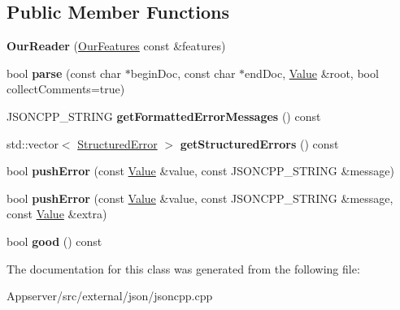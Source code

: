 \subsection*{Public Member Functions}
\begin{DoxyCompactItemize}
\item 
{\bfseries Our\+Reader} (\hyperlink{classJson_1_1OurFeatures}{Our\+Features} const \&features)\hypertarget{classJson_1_1OurReader_a48a850914b9c8d7781be172930c478e5}{}\label{classJson_1_1OurReader_a48a850914b9c8d7781be172930c478e5}

\item 
bool {\bfseries parse} (const char $\ast$begin\+Doc, const char $\ast$end\+Doc, \hyperlink{classJson_1_1Value}{Value} \&root, bool collect\+Comments=true)\hypertarget{classJson_1_1OurReader_aba4f8749aab7f02ec17f107e392caf80}{}\label{classJson_1_1OurReader_aba4f8749aab7f02ec17f107e392caf80}

\item 
J\+S\+O\+N\+C\+P\+P\+\_\+\+S\+T\+R\+I\+NG {\bfseries get\+Formatted\+Error\+Messages} () const\hypertarget{classJson_1_1OurReader_a7971de51d73bb4aee5b0c4742c4aaaac}{}\label{classJson_1_1OurReader_a7971de51d73bb4aee5b0c4742c4aaaac}

\item 
std\+::vector$<$ \hyperlink{structJson_1_1OurReader_1_1StructuredError}{Structured\+Error} $>$ {\bfseries get\+Structured\+Errors} () const\hypertarget{classJson_1_1OurReader_a0eb2420a6bef89a3f3256191e6e3de6d}{}\label{classJson_1_1OurReader_a0eb2420a6bef89a3f3256191e6e3de6d}

\item 
bool {\bfseries push\+Error} (const \hyperlink{classJson_1_1Value}{Value} \&value, const J\+S\+O\+N\+C\+P\+P\+\_\+\+S\+T\+R\+I\+NG \&message)\hypertarget{classJson_1_1OurReader_a700e9d8e0977fa7e0375d26690d7025f}{}\label{classJson_1_1OurReader_a700e9d8e0977fa7e0375d26690d7025f}

\item 
bool {\bfseries push\+Error} (const \hyperlink{classJson_1_1Value}{Value} \&value, const J\+S\+O\+N\+C\+P\+P\+\_\+\+S\+T\+R\+I\+NG \&message, const \hyperlink{classJson_1_1Value}{Value} \&extra)\hypertarget{classJson_1_1OurReader_addccecfca74b79adaad6115ddd614477}{}\label{classJson_1_1OurReader_addccecfca74b79adaad6115ddd614477}

\item 
bool {\bfseries good} () const\hypertarget{classJson_1_1OurReader_a63c7d874fa379397e0a5fa65f0843845}{}\label{classJson_1_1OurReader_a63c7d874fa379397e0a5fa65f0843845}

\end{DoxyCompactItemize}


The documentation for this class was generated from the following file\+:\begin{DoxyCompactItemize}
\item 
Appserver/src/external/json/jsoncpp.\+cpp\end{DoxyCompactItemize}
